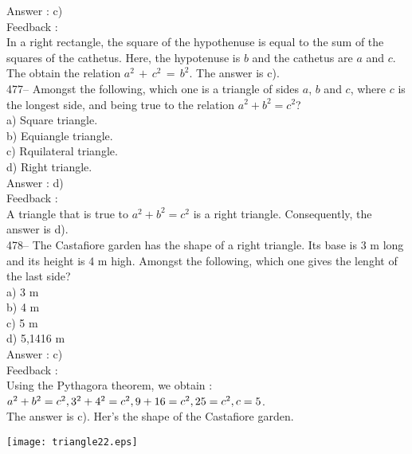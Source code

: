 ﻿\documentclass[letterpaper, 12pt]{article}
\begin{document}
Answer :  c)\\

Feedback : \\
In a right rectangle, the square of the hypothenuse is equal to the sum of the squares of the cathetus. Here, the hypotenuse is $b$ and the cathetus are $a$ and $c$. The obtain the relation $a^{2}\,+\,c^{2}\,=\,b^{2}$.  The answer is c).\\


477-- Amongst the following, which one is a triangle of sides $a$, $b$ and $c$, where $c$ is the longest side, and being true to the relation $a^{2}+b^{2}=c^{2}$?\\
a) Square triangle.\\
b) Equiangle triangle.\\
c) Rquilateral triangle.\\
d) Right triangle.\\

Answer :  d)\\

Feedback : \\
A triangle that is true to $a^{2}+b^{2}=c^{2}$ is a right triangle. Consequently, the answer is d).\\


478-- The Castafiore garden has the shape of a right triangle. Its base is 3 m long and its height is 4 m high. Amongst the following, which one gives the lenght of the last side?\\
a) 3 m\\
b) 4 m\\
c) 5 m\\
d) 5,1416 m\\

Answer :  c)\\

Feedback : \\
Using the Pythagora theorem, we obtain :\\
$a^{2}+b^{2}=c^{2},\\
3^{2}+4^{2}=c^{2},\\
9+16=c^{2},\\
25=c^{2},\\
c=5$.\\
The answer is c).  Her's the shape of the Castafiore garden.\\
    \begin{center}
    \texttt{[image: triangle22.eps]}
    \end{center}
\end{document}
